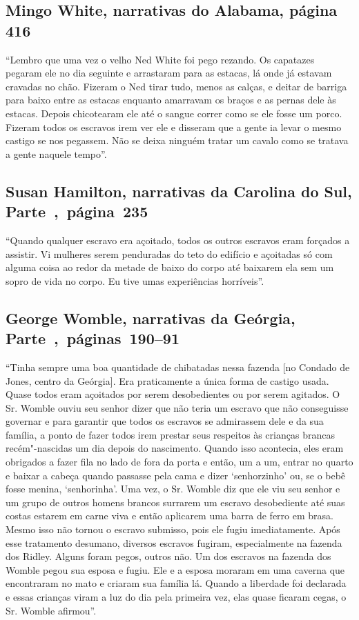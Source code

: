 \subsection{Mingo White, narrativas do Alabama, página 416}
\label{ref285}

``Lembro que uma vez o velho Ned White foi pego rezando. Os capatazes
pegaram ele no dia seguinte e arrastaram para as estacas, lá onde já
estavam cravadas no chão. Fizeram o Ned tirar tudo, menos as calças, e
deitar de barriga para baixo entre as estacas enquanto amarravam os
braços e as pernas dele às estacas. Depois chicotearam ele até o sangue
correr como se ele fosse um porco. Fizeram todos os escravos irem ver
ele e disseram que a gente ia levar o mesmo castigo se nos pegassem. Não
se deixa ninguém tratar um cavalo como se tratava a gente naquele
tempo''.

\subsection{Susan Hamilton, narrativas da Carolina do Sul, Parte~,~página~235}
\label{ref119}

``Quando qualquer escravo era açoitado, todos os outros escravos eram
forçados a assistir. Vi mulheres serem penduradas do teto do edifício e
açoitadas só com alguma coisa ao redor da metade de baixo do corpo até
baixarem ela sem um sopro de vida no corpo. Eu tive umas experiências
horríveis''.

\subsection{George Womble, narrativas da Geórgia, Parte~,~páginas~190--91}
\label{ref308}

``Tinha sempre uma boa quantidade de chibatadas nessa fazenda {[}no
Condado de Jones, centro da Geórgia{]}. Era praticamente a única forma
de castigo usada. Quase todos eram açoitados por serem desobedientes ou
por serem agitados. O Sr. Womble ouviu seu senhor dizer que não teria um
escravo que não conseguisse governar e para garantir que todos os
escravos se admirassem dele e da sua família, a ponto de fazer todos
irem prestar seus respeitos às crianças brancas recém"-nascidas um dia
depois do nascimento. Quando isso acontecia, eles eram obrigados a fazer
fila no lado de fora da porta e então, um a um, entrar no quarto e
baixar a cabeça quando passasse pela cama e dizer `senhorzinho' ou, se o
bebê fosse menina, `senhorinha'. Uma vez, o Sr. Womble diz que ele viu
seu senhor e um grupo de outros homens brancos surrarem um escravo
desobediente até suas costas estarem em carne viva e então aplicarem uma
barra de ferro em brasa. Mesmo isso não tornou o escravo submisso, pois
ele fugiu imediatamente. Após esse tratamento desumano, diversos
escravos fugiram, especialmente na fazenda dos Ridley. Alguns foram
pegos, outros não. Um dos escravos na fazenda dos Womble pegou sua
esposa e fugiu. Ele e a esposa moraram em uma caverna que encontraram no
mato e criaram sua família lá. Quando a liberdade foi declarada e essas
crianças viram a luz do dia pela primeira vez, elas quase ficaram cegas,
o Sr. Womble afirmou''.

